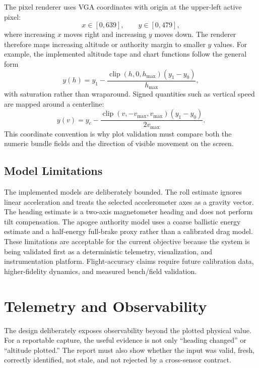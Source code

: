 \documentclass[11pt]{article}
\begin{document}
The pixel renderer uses VGA coordinates with origin at the upper-left active
pixel:
\begin{equation}
    x\in[0,639],\qquad y\in[0,479],
    \label{eq:vga-coords}
\end{equation}
where increasing $x$ moves right and increasing $y$ moves down.  The renderer
therefore maps increasing altitude or authority margin to smaller $y$ values.
For example, the implemented altitude tape and chart functions follow the
general form
\begin{equation}
    y(h)=y_1-\frac{\operatorname{clip}(h,0,h_{\max})(y_1-y_0)}{h_{\max}},
    \label{eq:y-map}
\end{equation}
with saturation rather than wraparound.  Signed quantities such as vertical
speed are mapped around a centerline:
\begin{equation}
    y(v)=y_c-\frac{\operatorname{clip}(v,-v_{\max},v_{\max})(y_1-y_0)}{2v_{\max}}.
    \label{eq:vspd-map}
\end{equation}
This coordinate convention is why plot validation must compare both the numeric
bundle fields and the direction of visible movement on the screen.

\subsection{Model Limitations}
\label{subsec:model-limitations}

The implemented models are deliberately bounded.  The roll estimate ignores
linear acceleration and treats the selected accelerometer axes as a gravity
vector.  The heading estimate is a two-axis magnetometer heading and does not
perform tilt compensation.  The apogee authority model uses a coarse ballistic
energy estimate and a half-energy full-brake proxy rather than a calibrated drag
model.  These limitations are acceptable for the current objective because the
system is being validated first as a deterministic telemetry, visualization, and
instrumentation platform.  Flight-accuracy claims require future calibration
data, higher-fidelity dynamics, and measured bench/field validation.

\section{Telemetry and Observability}
\label{sec:observability}

The design deliberately exposes observability beyond the plotted physical value.
For a reportable capture, the useful evidence is not only ``heading changed'' or
``altitude plotted.''  The report must also show whether the input was valid,
fresh, correctly identified, not stale, and not rejected by a cross-sensor
contract.
\end{document}
